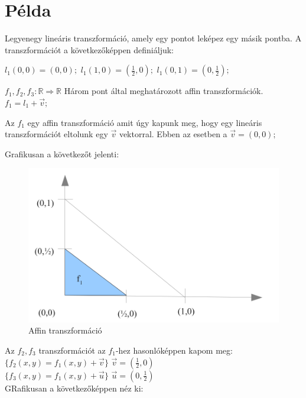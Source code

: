 \section{Példa}
Legyenegy lineáris transzformáció, amely egy pontot leképez egy másik pontba. A transzformációt a  következőképpen definiáljuk:

$l_{1}(0,0)=(0,0);$ $l_{1}(1,0)=(\frac{1}{2},0);$ $l_{1}(0,1)=(0,\frac{1}{2});$

$f_{1}, f_{2}, f_{3}: \mathbb{R} \Rightarrow \mathbb{R}$ Három pont által meghatározott affin transzformációk. \\
$f_{1}=l_{1}+\vec{v};$

Az $f_{1}$ egy affin transzformáció amit úgy kapunk meg, hogy egy lineáris transzformációt eltolunk egy $\vec{v}$ vektorral. Ebben az esetben a $\vec{v}=(0,0);$

\newpage

Grafikusan a következőt jelenti:

\begin{figure}[H]
	\centering	
	\includegraphics[scale=0.35]{Images/Grafikon1}
	\caption{Affin transzformáció}
\end{figure}

Az $f_{2}, f_{3}$ transzformációt az $f_1$-hez hasonlóképpen kapom meg:\\

$\{f_{2}(x,y)=f_{1}(x,y)+\vec{v}\}$ $\vec{v}=(\frac{1}{2},0)$ \\
\indent$\{f_{3}(x,y)=f_{1}(x,y)+\vec{u}\}$ $\vec{u}=(0,\frac{1}{2})$ \\

GRafikusan a következőképpen néz ki:

